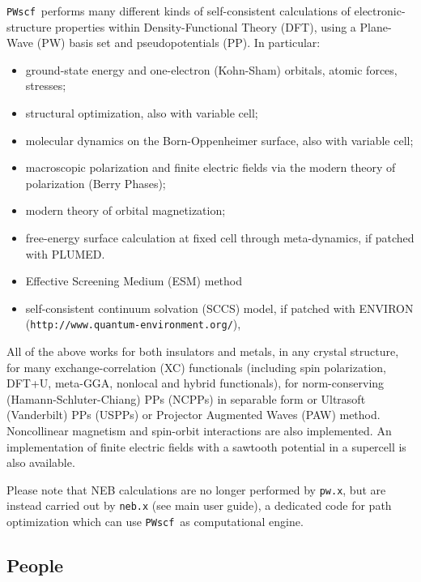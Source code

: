 \documentclass[12pt,a4paper]{article}
\def\PWscf{\texttt{PWscf}}
\def\pwx{\texttt{pw.x}}
\begin{document}
\PWscf\ performs many different kinds of
self-consistent calculations of electronic-structure
properties within
Density-Functional Theory (DFT), using a Plane-Wave (PW) basis set and pseudopotentials (PP).
In particular:
\begin{itemize}
  \item ground-state energy and one-electron (Kohn-Sham) orbitals, 
        atomic forces, stresses;
  \item structural optimization, also with variable cell;
  \item molecular dynamics on the Born-Oppenheimer surface, also with variable cell;
  \item macroscopic polarization and finite electric fields via 
  the modern theory of polarization (Berry Phases);
  \item modern theory of orbital magnetization;
  \item free-energy surface calculation at fixed cell through meta-dynamics, if patched with PLUMED.
  \item Effective Screening Medium (ESM) method
  \item self-consistent continuum solvation (SCCS) model, if patched with
    ENVIRON (\texttt{http://www.quantum-environment.org/}),
\end{itemize}
All of the above works for both insulators and metals, 
in any crystal structure, for many exchange-correlation (XC) functionals
(including spin polarization, DFT+U, meta-GGA, nonlocal and hybrid 
functionals), for
norm-conserving (Hamann-Schluter-Chiang) PPs (NCPPs) in 
separable form or Ultrasoft (Vanderbilt) PPs (USPPs)
or Projector Augmented Waves (PAW) method.
Noncollinear magnetism and spin-orbit interactions 
are also implemented.  An implementation of finite electric 
fields with a sawtooth potential in a supercell is also available.

Please note that NEB calculations are no longer performed by \pwx,
but are instead carried out by \texttt{neb.x} (see main user guide), 
a dedicated code for path optimization which can use \PWscf\ as 
computational engine.

\subsection{People}
\end{document}
